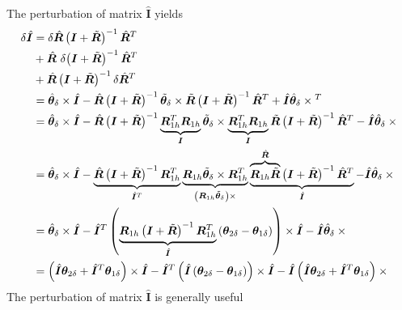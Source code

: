 \documentclass[10pt,dvips,fleqn,subeqn]{report}
\newcommand{\T}[1]{\bm{#1}}
\newcommand{\TT}[1]{\bm{#1}}
\begin{document}
The perturbation of matrix $\hat{\TT{I}}$ yields
\begin{subequations}
\begin{align}
	\delta\hat{\T{I}}
	&= \delta\hat{\T{R}} \plbr{\T{I} + \tilde{\T{R}}}^{-1} \hat{\T{R}}^T
	\nonumber \\
	& \mbox{}
	+ \hat{\T{R}} \ \delta\! \plbr{\T{I} + \tilde{\T{R}}}^{-1} \hat{\T{R}}^T
	\nonumber \\
	& \mbox{}
	+ \hat{\T{R}} \plbr{\T{I} + \tilde{\T{R}}}^{-1} \delta\hat{\T{R}}^T \\
	&= \hat{\T{\theta}}_{\delta}\times\hat{\TT{I}}
		- \hat{\TT{R}} \plbr{\TT{I} + \tilde{\TT{R}}}^{-1}
			\tilde{\T{\theta}}_{\delta}\times\tilde{\TT{R}}
			\plbr{\TT{I} + \tilde{\TT{R}}}^{-1} \hat{\TT{R}}^T
		+ \hat{\TT{I}} \hat{\T{\theta}}_{\delta}\times{}^T
	\nonumber \\
	&= \hat{\T{\theta}}_{\delta}\times\hat{\TT{I}}
	- \hat{\TT{R}} \plbr{\TT{I} + \tilde{\TT{R}}}^{-1}
		\underbrace{\TT{R}_{1h}^T \TT{R}_{1h}}_{\TT{I}}
		\tilde{\T{\theta}}_{\delta}\times \underbrace{\TT{R}_{1h}^T \TT{R}_{1h}}_{\TT{I}} \tilde{\TT{R}} 
		\plbr{\TT{I} + \tilde{\TT{R}}}^{-1} \hat{\TT{R}}^T
	- \hat{\TT{I}} \hat{\T{\theta}}_{\delta}\times{}
	\nonumber \\
	&= \hat{\T{\theta}}_{\delta}\times\hat{\TT{I}}
	- \underbrace{\hat{\TT{R}} \plbr{\TT{I} + \tilde{\TT{R}}}^{-1} \TT{R}_{1h}^T}_{\hat{\TT{I}}^T}
		\underbrace{
			\TT{R}_{1h} \tilde{\T{\theta}}_{\delta}\times \TT{R}_{1h}^T
		}_{\plbr{\TT{R}_{1h} \tilde{\T{\theta}}_{\delta}}\times{}}
		\underbrace{
			\overbrace{\TT{R}_{1h} \tilde{\TT{R}}}^{\hat{\TT{R}}} \plbr{\TT{I} + \tilde{\TT{R}}}^{-1} \hat{\TT{R}}^T
		}_{\hat{\TT{I}}}
	- \hat{\TT{I}} \hat{\T{\theta}}_{\delta}\times{}
	\nonumber \\
	&= \hat{\T{\theta}}_{\delta}\times\hat{\TT{I}}
	- \hat{\TT{I}}^T \plbr{
		\underbrace{
			\TT{R}_{1h}\plbr{\TT{I} + \tilde{\TT{R}}}^{-1}\TT{R}_{1h}^T
		}_{\hat{\TT{I}}} \plbr{\T{\theta}_{2\delta} - \T{\theta}_{1\delta}}
	}\times \hat{\TT{I}}
	- \hat{\TT{I}} \hat{\T{\theta}}_{\delta}\times{}
	\nonumber \\
	&= \plbr{\hat{\TT{I}}\T{\theta}_{2\delta} + \hat{\TT{I}}^T\T{\theta}_{1\delta}}\times\hat{\TT{I}}
	- \hat{\TT{I}}^T \plbr{\hat{\TT{I}}\plbr{\T{\theta}_{2\delta} - \T{\theta}_{1\delta}}}\times \hat{\TT{I}}
	- \hat{\TT{I}}\plbr{\hat{\TT{I}}\T{\theta}_{2\delta} + \hat{\TT{I}}^T\T{\theta}_{1\delta}}\times{}
\end{align}
\end{subequations}
The perturbation of matrix $\hat{\T{I}}$ is generally useful
\end{document}
